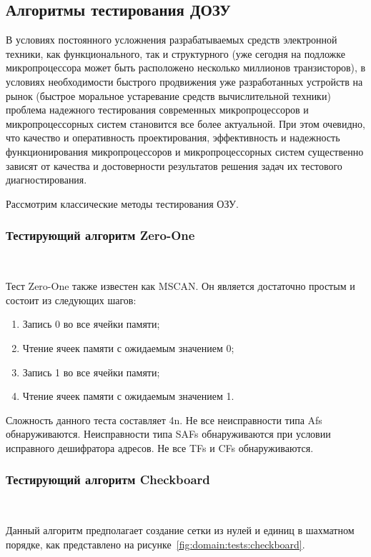 \subsection{Алгоритмы тестирования ДОЗУ}
\label{sub:domain:tests}

В условиях постоянного усложнения разрабатываемых средств электронной техники, как функционального, так и структурного (уже сегодня на подложке микропроцессора может быть расположено несколько миллионов транзисторов), в условиях необходимости быстрого продвижения уже разработанных устройств на рынок (быстрое моральное устаревание средств вычислительной техники) проблема надежного тестирования современных микропроцессоров и микропроцессорных систем становится все более актуальной. При этом очевидно, что качество и оперативность проектирования, эффективность и надежность функционирования микропроцессоров и микропроцессорных систем существенно зависят от качества и достоверности результатов решения задач их тестового диагностирования.

Рассмотрим классические методы тестирования ОЗУ.

\subsubsection{Тестирующий алгоритм Zero-One}~\\
\label{sub:domain:tests:zero-one}

Тест Zero-One также известен как MSCAN. Он является достаточно простым и состоит из следующих шагов:
\begin{enumerate}
\item Запись 0 во все ячейки памяти;
\item Чтение ячеек памяти с ожидаемым значением 0;
\item Запись 1 во все ячейки памяти;
\item Чтение ячеек памяти с ожидаемым значением 1.
\end{enumerate}
Сложность данного теста составляет 4n. Не все неисправности типа Afs обнаруживаются. Неисправности типа SAFs обнаруживаются при условии исправного дешифратора адресов. Не все TFs и CFs обнаруживаются.

\subsubsection{Тестирующий алгоритм Checkboard}~\\
\label{sub:domain:tests:checkboard}

Данный алгоритм предполагает создание сетки из нулей и единиц в шахматном порядке, как представлено на рисунке~\ref{fig:domain:tests:checkboard}. 

